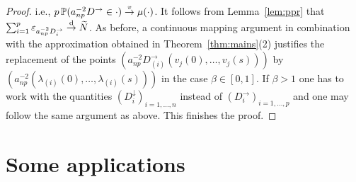 \begin{proof}
i.e., $
 p \, \P(a_{np}^{-2} D^\rightarrow\in \cdot ) \stackrel{v}{\rightarrow} \mu(\cdot)$.
It follows from Lemma~\ref{lem:ppr} that
$\sum_{i=1}^p\vep_{a_{np}^{-2} D_i^\rightarrow}\std \widetilde{N}$. As before,
a continuous mapping argument in combination with
the approximation obtained in Theorem~\ref{thm:mains}(2)
justifies the replacement of the points $(a_{np}^{-2} D_{(i)}^\rightarrow(v_j(0),\ldots,v_j(s)))$ by
$(a_{np}^{-2} (\lambda_{(i)}(0),\ldots,\lambda_{(i)}(s)))$ in the case $\beta\in [0,1]$. If $\beta>1$ one has to work with the
quantities $(D_i^\downarrow)_{i=1,\ldots,n}$ instead of  $(D_i^\rightarrow)_{i=1,\ldots,p}$ and one may follow the same argument as above.
This finishes the proof.
\end{proof}

\section{Some applications}

